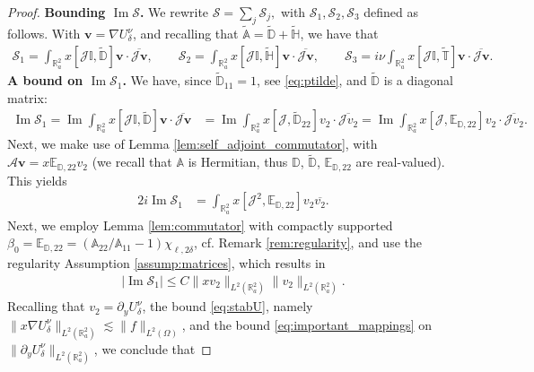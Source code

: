 \documentclass[report]{elsarticle}
\numberwithin{theorem}{section}
\renewcommand{\Im}{\operatorname{Im}}
\renewcommand{\vec}[1]{\mathbf{#1}}
\begin{document}
\begin{proof}
\textbf{Bounding $\Im\mathcal{S}$. }		
We rewrite $
	\mathcal{S}=\sum_{j}\mathcal{S}_j, $
with $\mathcal{S}_1, \mathcal{S}_2, \mathcal{S}_3$ defined as follows. With $\vec{v}=\nabla U^{\nu}_{\delta}$, and recalling that  $\widetilde{\mathbb{A}}=\widetilde{\mathbb{D}}+\widetilde{\mathbb{H}}$, we have that  
\begin{align}
	\label{eq:s123}
	\mathcal{S}_1=\int_{\mathbb{R}^2_a}x[\mathcal{J}\mathbb{I}, \widetilde{\mathbb{D}}]\vec{v}\cdot \overline{\mathcal{J}\vec{v}},\qquad 
	\mathcal{S}_2=\int_{\mathbb{R}^2_a}x[\mathcal{J}\mathbb{I}, \widetilde{\mathbb{H}}]\vec{v}\cdot \overline{\mathcal{J}\vec{v}},\qquad 			\mathcal{S}_3=i\nu \int_{\mathbb{R}^2_a}x[\mathcal{J}\mathbb{I}, \widetilde{\mathbb{T}}]\vec{v}\cdot \overline{\mathcal{J}\vec{v}}.
\end{align} 
\textbf{A bound on $\Im \mathcal{S}_1$. }We have, since $\widetilde{\mathbb{D}}_{11}=1$, see  \eqref{eq:ptilde}, and $\widetilde{\mathbb{D}}$ is a diagonal matrix:
\begin{align}
	\label{eq:I1}
	\Im\mathcal{S}_1=\Im \int_{\mathbb{R}^2_a}x[\mathcal{J}\mathbb{I}, \widetilde{\mathbb{D}}]\vec{v}\cdot \overline{\mathcal{J}\vec{v}}&=	\Im \int_{\mathbb{R}^2_a}x[\mathcal{J},\widetilde{\mathbb{D}}_{22}]v_2\cdot \overline{\mathcal{J}v_2}=\Im \int_{\mathbb{R}^2_a}x[\mathcal{J},\mathbb{E}_{\mathbb{D},22}]v_2\cdot \overline{\mathcal{J}v_2}.
\end{align}
Next, we make use of Lemma \ref{lem:self_adjoint_commutator}, with $\mathcal{A}\vec{v}=x\mathbb{E}_{\mathbb{D},22}v_2$ (we recall that $\mathbb{A}$ is Hermitian, thus $\mathbb{D}$, $\widetilde{\mathbb{D}}$, ${\mathbb{E}}_{\mathbb{D},22}$ are real-valued). This yields
\begin{align*}
	2i\Im \mathcal{S}_1&=\int_{\mathbb{R}^2_a}x[\mathcal{J}^2, \mathbb{E}_{\mathbb{D},22}]v_2\overline{v_2}.
\end{align*}
Next, we employ Lemma \ref{lem:commutator} with compactly supported  $\beta_0=\mathbb{E}_{\mathbb{D},22}=(\mathbb{A}_{22}/\mathbb{A}_{11}-1)\chi_{\ell,2\delta}$, cf. Remark \ref{rem:regularity}, and use the regularity Assumption \ref{assump:matrices}, which results in 
\begin{align*}
	|\Im \mathcal{S}_1|\leq C \|xv_2\|_{L^2(\mathbb{R}^2_a)}\|v_2\|_{L^2(\mathbb{R}^2_a)}.
\end{align*}
Recalling that $v_2=\partial_y U^{\nu}_{\delta}$, the bound \eqref{eq:stabU}, namely $\|x\nabla U^{\nu}_{\delta}\|_{L^2(\mathbb{R}^2_a)}\lesssim \|f\|_{L^2(\Omega)}$, and the bound \eqref{eq:important_mappings} on $\|\partial_y U^{\nu}_{\delta}\|_{L^2(\mathbb{R}^2_a)}$, we conclude that 

\end{proof}
\end{document}
